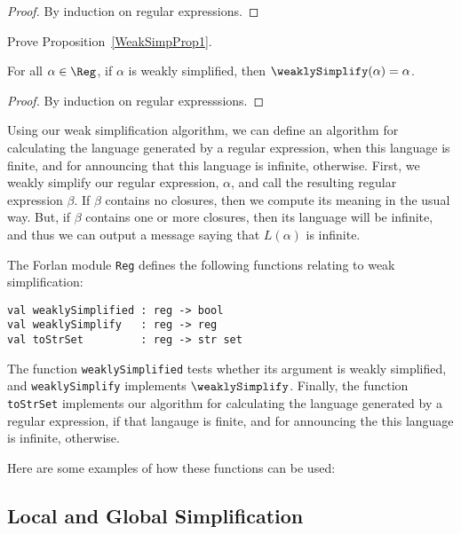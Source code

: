 \begin{proof}
By induction on regular expressions.
\end{proof}

\begin{exercise}
\label{WeakSimpExercise}
Prove Proposition~\ref{WeakSimpProp1}.
\end{exercise}

\begin{proposition}
For all $\alpha\in\Reg$, if $\alpha$ is weakly simplified, then
$\weaklySimplify(\alpha) = \alpha$.
\end{proposition}

\begin{proof}
By induction on regular expresssions.
\end{proof}

Using our weak simplification algorithm, we can define an algorithm
for calculating the language generated by a regular expression, when
this language is finite, and for announcing that this language is
infinite, otherwise.  First, we weakly simplify our regular
expression, $\alpha$, and call the resulting regular expression
$\beta$.  If $\beta$ contains no closures, then we compute its meaning
in the usual way.  But, if $\beta$ contains one or more closures, then
its language will be infinite, and thus we can output a message saying
that $L(\alpha)$ is infinite.

The Forlan module \texttt{Reg} defines the following functions relating
to weak simplification:
\begin{verbatim}
val weaklySimplified : reg -> bool
val weaklySimplify   : reg -> reg
val toStrSet         : reg -> str set
\end{verbatim}
The function \texttt{weaklySimplified} tests whether its argument is
weakly simplified, and \texttt{weaklySimplify} implements
$\weaklySimplify$.  Finally, the function \texttt{toStrSet} implements our
algorithm for calculating the language generated by a regular expression,
if that langauge is finite, and for announcing the this language is
infinite, otherwise.

Here are some examples of how these functions can be used:


\subsection{Local and Global Simplification}

